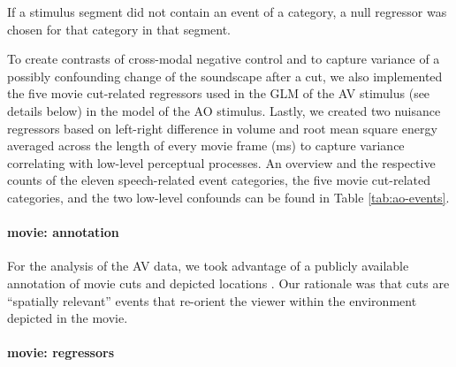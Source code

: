 \documentclass[english]{article}
\begin{document}
If a stimulus segment did not contain an event of a category, a null regressor
was chosen for that category in that segment.

To create contrasts of cross-modal negative control and to capture variance of a
possibly confounding change of the soundscape after a cut, we also implemented
the five movie cut-related regressors used in the GLM of the AV stimulus (see
details below) in the model of the AO stimulus.
%
Lastly, we created two nuisance regressors based on left-right difference in
volume and root mean square energy averaged across the length of every movie
frame (\unit[40]{ms}) to capture variance correlating with low-level perceptual
processes.
An overview and the respective counts of the eleven speech-related event
categories, the five movie cut-related categories, and the two low-level
confounds can be found in Table \ref{tab:ao-events}.


\paragraph{movie: annotation}

For the analysis of the AV data, we took advantage of a publicly available
annotation of movie cuts and depicted locations \citep{haeusler2016cutanno}.
Our rationale was that cuts are ``spatially relevant'' events that re-orient the
viewer within the environment depicted in the movie.



\paragraph{movie: regressors}
\end{document}
